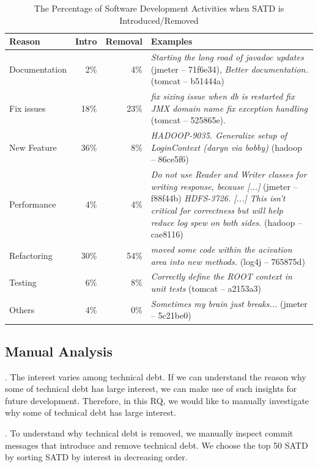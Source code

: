 \documentclass[10pt, conference]{IEEEtran}
\newcommand{\smallsection}[1]{\vspace{1mm}\noindent {\bf #1}.\hspace{2mm}}
\begin{document}
\begin{table}[tb]
  \caption{The Percentage of Software Development Activities when SATD is Introduced/Removed}
  \label{tab:percentage_activities} 
  \centering

  \begin{tabular}{l|r|r|p{2.80in}}
  \hline
       \textbf{Reason} & \textbf{Intro} & \textbf{Removal} & \textbf{Examples} \\
  \hline
  Documentation & 2\%  &   4\% &  \textit{Starting the long road of javadoc updates} (jmeter -- 71f6e34), \textit{Better documentation.} (tomcat -- b51444a) \\
  Fix issues  &  18\%  &  23\% &  \textit{fix sizing issue when db is restarted fix JMX domain name fix exception handling} (tomcat -- 525865e). \\
  New Feature &  36\%  &   8\% &  \textit{HADOOP-9035. Generalize setup of LoginContext (daryn via bobby)} (hadoop -- 86ce5f6) \\
  Performance &   4\%  &   4\% &  \textit{Do not use Reader and Writer classes for writing response, because [...]} (jmeter -- f88f44b) \textit{HDFS-3726. [...] This isn't critical for correctness but will help reduce log spew on both sides.} (hadoop -- cae8116) \\ 
  Refactoring &  30\%  &  54\% &  \textit{moved some code within the acivation area into new methods.} (log4j -- 765875d) \\
  Testing     &   6\%  &   8\% &  \textit{Correctly define the ROOT context in unit tests} (tomcat -- a2153a3) \\
  Others      &   4\%  &   0\% &  \textit{Sometimes my brain just breaks...} (jmeter -- 5c21be0) \\
  \hline
  \end{tabular}
\end{table}

\subsection{Manual Analysis}
\smallsection{Motivation}
The interest varies among technical debt. If we can understand the reason why some of technical debt has large interest, we can make use of such insights for future development. Therefore, in this RQ, we would like to manually investigate why some of technical debt has large interest.


\smallsection{Approach}
To understand why technical debt is removed, we manually inspect commit messages that introduce and remove technical debt. We choose the top 50 SATD by sorting SATD by interest in decreasing order.
\end{document}
